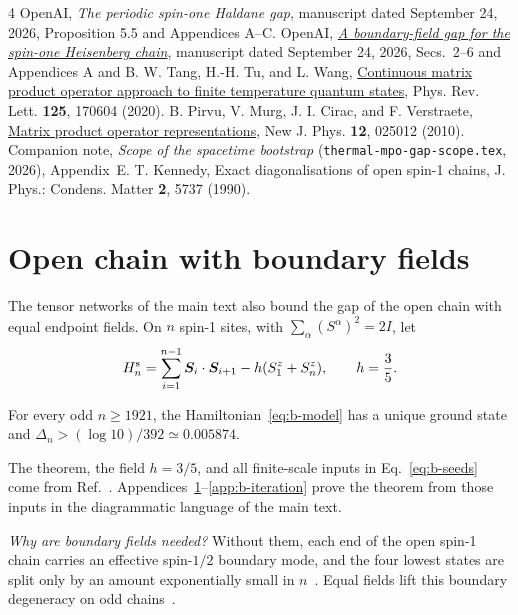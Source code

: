 \documentclass[aps,prl,reprint,amsmath,amssymb,nofootinbib,raggedbottom]{revtex4-2}
\begin{document}
\begin{thebibliography}{4}
OpenAI, \emph{The periodic spin-one Haldane gap}, manuscript dated
September 24, 2026, Proposition 5.5 and Appendices A--C.
OpenAI, \href{https://github.com/openai/math/blob/main/preprints/A-boundary-field-gap-for-the-spin-one-Heisenberg-chain-September-24-2026/paper.pdf}
{\emph{A boundary-field gap for the spin-one Heisenberg chain}},
manuscript dated September 24, 2026, Secs.~2--6 and Appendices A and B.
W. Tang, H.-H. Tu, and L. Wang,
\href{https://doi.org/10.1103/PhysRevLett.125.170604}
{Continuous matrix product operator approach to finite temperature quantum states},
Phys. Rev. Lett. \textbf{125}, 170604 (2020).
B. Pirvu, V. Murg, J. I. Cirac, and F. Verstraete,
\href{https://doi.org/10.1088/1367-2630/12/2/025012}
{Matrix product operator representations},
New J. Phys. \textbf{12}, 025012 (2010).
Companion note, \emph{Scope of the spacetime bootstrap}
(\texttt{thermal-mpo-gap-scope.tex}, 2026), Appendix~E.
T. Kennedy, Exact diagonalisations of open spin-1 chains,
J. Phys.: Condens. Matter \textbf{2}, 5737 (1990).
\end{thebibliography}

\clearpage
\appendix
\setcounter{secnumdepth}{2}
\section{Open chain with boundary fields}\label{app:open}
The tensor networks of the main text also bound the gap of the open chain with
equal endpoint fields. On $n$ spin-1 sites, with
$\sum_\alpha(S^\alpha)^2=2I$, let
\begin{equation}
 H_n^{\mathrm{s}}=\sum_{i=1}^{n-1}\bm S_i\cdot\bm S_{i+1}
       -h(S_1^z+S_n^z),\qquad h=\frac35.
 \label{eq:b-model}
\end{equation}
\begin{theorem}\label{thm:b-gap}
For every odd $n\ge1921$, the Hamiltonian~\eqref{eq:b-model} has a unique
ground state and $\Delta_n>(\log10)/392\simeq0.005874$.
\end{theorem}
The theorem, the field $h=3/5$, and all finite-scale inputs in
Eq.~\eqref{eq:b-seeds} come from Ref.~\cite{boundary}.
Appendices~\ref{app:open}--\ref{app:b-iteration} prove the theorem from those
inputs in the diagrammatic language of the main text.

\emph{Why are boundary fields needed?} Without them, each end of the open
spin-1 chain carries an effective spin-$1/2$ boundary mode, and the four lowest
states are split only by an amount exponentially small in
$n$~\cite{kennedy}. Equal fields lift this boundary degeneracy on odd
chains~\cite{boundary}.
\end{document}
